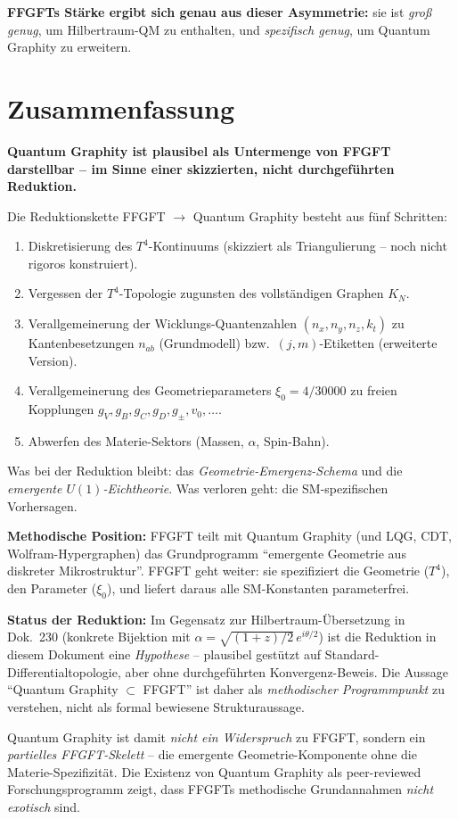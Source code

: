 \textbf{FFGFTs Stärke ergibt sich genau aus dieser Asymmetrie:}
sie ist \emph{groß genug}, um Hilbertraum-QM zu enthalten, und
\emph{spezifisch genug}, um Quantum Graphity zu erweitern.

\section{Zusammenfassung}

\textbf{Quantum Graphity ist plausibel als Untermenge von FFGFT
darstellbar -- im Sinne einer skizzierten, nicht durchgeführten
Reduktion.}

Die Reduktionskette FFGFT $\to$ Quantum Graphity besteht aus fünf
Schritten:
\begin{enumerate}[leftmargin=2em,itemsep=2pt,topsep=2pt]
  \item Diskretisierung des $T^4$-Kontinuums (skizziert als
        Triangulierung -- noch nicht rigoros konstruiert).
  \item Vergessen der $T^4$-Topologie zugunsten des vollständigen
        Graphen $K_N$.
  \item Verallgemeinerung der Wicklungs-Quantenzahlen
        $(n_x, n_y, n_z, k_t)$ zu Kantenbesetzungen $n_{ab}$
        (Grundmodell) bzw.\ $(j, m)$-Etiketten (erweiterte Version).
  \item Verallgemeinerung des Geometrieparameters $\xi_0 = 4/30000$
        zu freien Kopplungen $g_V, g_B, g_C, g_D, g_\pm, v_0, \ldots$.
  \item Abwerfen des Materie-Sektors (Massen, $\alpha$, Spin-Bahn).
\end{enumerate}

Was bei der Reduktion bleibt: das \emph{Geometrie-Emergenz-Schema}
und die \emph{emergente $U(1)$-Eichtheorie}. Was verloren geht: die
SM-spezifischen Vorhersagen.

\textbf{Methodische Position:} FFGFT teilt mit Quantum Graphity (und
LQG, CDT, Wolfram-Hypergraphen) das Grundprogramm \enquote{emergente
Geometrie aus diskreter Mikrostruktur}. FFGFT geht weiter: sie
spezifiziert die Geometrie ($T^4$), den Parameter ($\xi_0$), und
liefert daraus alle SM-Konstanten parameterfrei.

\textbf{Status der Reduktion:} Im Gegensatz zur Hilbertraum-Übersetzung
in Dok.~230 (konkrete Bijektion mit $\alpha = \sqrt{(1+z)/2}\,e^{i\theta/2}$)
ist die Reduktion in diesem Dokument eine \emph{Hypothese} -- plausibel
gestützt auf Standard-Differentialtopologie, aber ohne durchgeführten
Konvergenz-Beweis. Die Aussage \enquote{Quantum Graphity $\subset$
FFGFT} ist daher als \emph{methodischer Programmpunkt} zu verstehen,
nicht als formal bewiesene Strukturaussage.

Quantum Graphity ist damit \emph{nicht ein Widerspruch} zu FFGFT,
sondern ein \emph{partielles FFGFT-Skelett} -- die emergente
Geometrie-Komponente ohne die Materie-Spezifizität. Die Existenz
von Quantum Graphity als peer-reviewed Forschungsprogramm zeigt,
dass FFGFTs methodische Grundannahmen \emph{nicht exotisch} sind.
